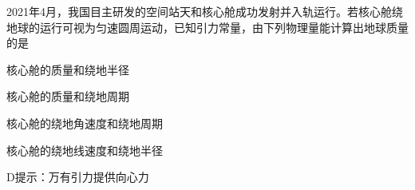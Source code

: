 2021年4月，我国目主研发的空间站天和核心舱成功发射并入轨运行。若核心舱绕地球的运行可视为匀速圆周运动，已知引力常量，由下列物理量能计算出地球质量的是\paren[]
\begin{choices}
	\item 核心舱的质量和绕地半径
	\item 核心舱的质量和绕地周期
	\item 核心舱的绕地角速度和绕地周期
	\item 核心舱的绕地线速度和绕地半径
\end{choices}	
\begin{answer}
	D\qquad 提示：万有引力提供向心力
\end{answer}